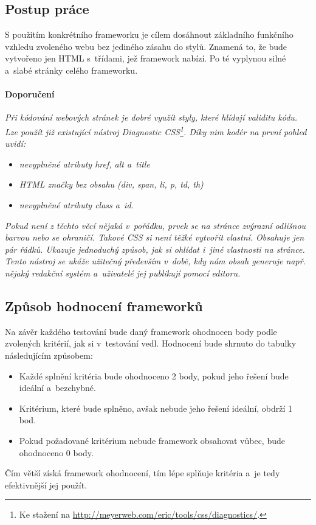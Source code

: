 \documentclass[thesis=B,czech]{FITthesis}[2012/06/26]
\begin{document}
\subsection{Postup práce}

S použitím konkrétního frameworku je cílem dosáhnout základního funkčního vzhledu zvoleného webu bez jediného zásahu do stylů. Znamená to, že bude vytvořeno jen HTML s~třídami, jež framework nabízí. Po té vyplynou silné a~slabé stránky celého frameworku. 


\paragraph{Doporučení}

 \textit{Při kódování webových stránek je dobré využít styly, které hlídají validitu kódu. Lze použít již existující nástroj Diagnostic CSS\footnote{Ke stažení na \url{http://meyerweb.com/eric/tools/css/diagnostics/}.}. Díky nim kodér na první pohled uvidí: }

\begin{itemize}
 \item \textit{nevyplněné atributy href, alt a~title}
 \item \textit{HTML značky bez obsahu (div, span, li, p, td, th)}
 \item \textit{nevyplněné atributy class a~id}.
\end{itemize}
\textit{Pokud není z těchto věcí nějaká v~pořádku, prvek se na stránce zvýrazní odlišnou barvou nebo se ohraničí. Takové CSS  si není těžké vytvořit vlastní. Obsahuje jen pár řádků. Ukazuje jednoduchý způsob, jak si ohlídat i~jiné vlastnosti na stránce. Tento nástroj se ukáže užitečný především v~době, kdy nám obsah generuje např. nějaký redakční systém a~uživatelé jej publikují pomocí editoru.}


\subsection{Způsob hodnocení frameworků}

Na závěr každého testování bude daný framework ohodnocen body podle zvolených kritérií, jak si v~testování vedl. Hodnocení bude shrnuto do tabulky následujícím způsobem:

\begin{itemize}
 \item Každé splnění kritéria bude ohodnoceno 2 body, pokud jeho řešení bude ideální a~bezchybné.
 \item Kritérium, které bude splněno, avšak nebude jeho řešení ideální, obdrží 1 bod.
 \item Pokud požadované kritérium nebude framework obsahovat vůbec, bude ohodnoceno 0 body.
\end{itemize}
Čím větší získá framework ohodnocení, tím lépe splňuje kritéria a~je tedy efektivnější jej použít.
\end{document}
